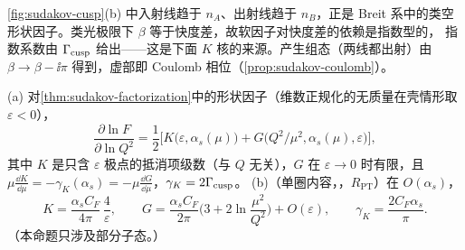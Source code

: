 \cref{fig:sudakov-cusp}(b) 中入射线趋于 $n_A$、出射线趋于 $n_B$，正是 Breit 系中的类空形状因子。类光极限下 $\beta$ 等于快度差，故软因子对快度差的依赖是指数型的，
指数系数由 $\Gamma_{\rm cusp}$ 给出——这是下面 $K$ 核的来源。产生组态（两线都出射）由 $\beta\to\beta-\ii\pi$ 得到，虚部即 Coulomb 相位（\cref{prop:sudakov-coulomb}）。

\begin{proposition}\label{prop:sudakov-kg}
(a) 对\cref{thm:sudakov-factorization}中的形状因子（维数正规化的无质量在壳情形取 $\varepsilon<0$），
\begin{equation}\label{eq:sudakov-KG}
\frac{\partial\ln F}{\partial\ln Q^2}=\frac12\Big[K\big(\varepsilon,\alpha_s(\mu)\big)+G\big(Q^2/\mu^2,\alpha_s(\mu),\varepsilon\big)\Big],
\end{equation}
其中 $K$ 是只含 $\varepsilon$ 极点的抵消项级数（与 $Q$ 无关），$G$ 在 $\varepsilon\to0$ 时有限，且
$\mu\frac{\dd K}{\dd\mu}=-\gamma_K(\alpha_s)=-\mu\frac{\dd G}{\dd\mu}$，$\gamma_K=2\Gamma_{\rm cusp}$。
(b)（单圈内容，\tagR，$R_{\mathrm{PT}}$）在 $O(\alpha_s)$，
\begin{equation}\label{eq:sudakov-KG-1loop}
K=\frac{\alpha_sC_F}{4\pi}\,\frac4\varepsilon,\qquad G=\frac{\alpha_sC_F}{2\pi}\Big(3+2\ln\frac{\mu^2}{Q^2}\Big)+O(\varepsilon),\qquad
\gamma_K=\frac{2C_F\alpha_s}{\pi}.
\end{equation}
（本命题只涉及部分子态。）
\end{proposition}

